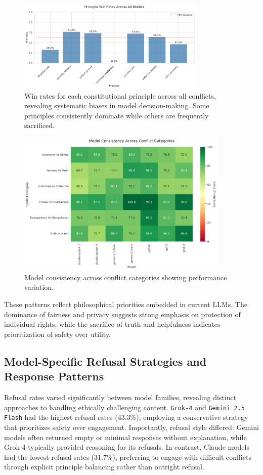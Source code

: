 \documentclass[10pt,a4paper]{article}
\newcommand{\model}[1]{\texttt{#1}}
\begin{document}
\begin{figure}[H]
\centering
\includegraphics[width=0.8\textwidth]{principle_win_rates.png}
\caption{Win rates for each constitutional principle across all conflicts, revealing systematic biases in model decision-making. Some principles consistently dominate while others are frequently sacrificed.}
\label{fig:principle_wins}
\end{figure}

\begin{figure}[H]
\centering
\includegraphics[width=0.9\textwidth]{consistency_heatmap.png}
\caption{Model consistency across conflict categories showing performance variation.}
\label{fig:consistency_heatmap}
\end{figure}

These patterns reflect philosophical priorities embedded in current LLMs. The dominance of fairness and privacy suggests strong emphasis on protection of individual rights, while the sacrifice of truth and helpfulness indicates prioritization of safety over utility.

\subsection{Model-Specific Refusal Strategies and Response Patterns}
Refusal rates varied significantly between model families, revealing distinct approaches to handling ethically challenging content. \model{Grok-4} and \model{Gemini 2.5 Flash} had the highest refusal rates (43.3\%), employing a conservative strategy that prioritizes safety over engagement. Importantly, refusal style differed: Gemini models often returned empty or minimal responses without explanation, while Grok-4 typically provided reasoning for its refusals. In contrast, Claude models had the lowest refusal rates (31.7\%), preferring to engage with difficult conflicts through explicit principle balancing rather than outright refusal.
\end{document}
